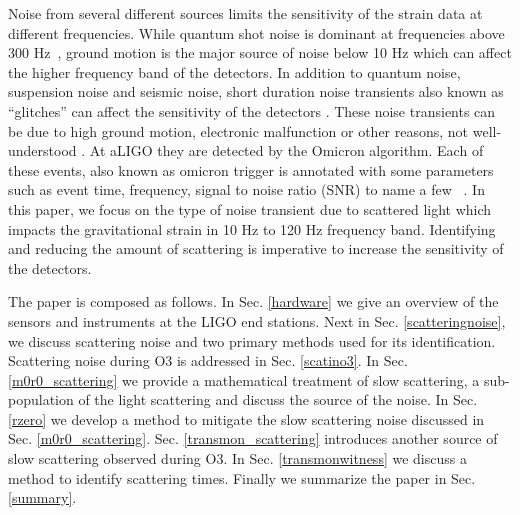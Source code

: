 \documentclass[12pt]{iopart}
\begin{document}
Noise from several different sources limits the sensitivity of the strain data at different frequencies. 
While quantum shot noise is dominant at frequencies above 300 Hz~\cite{tjthesis}, ground motion is the major source of noise below 10 Hz which can affect the higher frequency band of the detectors. In addition to quantum noise, suspension noise and seismic noise, short duration noise transients also known as ``glitches'' can affect the sensitivity of the detectors \cite{transientpaper}. These noise transients can be due to high ground motion, electronic malfunction or other reasons, not well-understood \cite{Nuttall_2018,noisepaper,Cabero_2019}. At aLIGO they are detected by the Omicron algorithm. Each of these events, also known as omicron trigger is annotated with some parameters such as event time, frequency, signal to noise ratio (SNR) to name a few ~\cite{omicron_florent,jess_thesis}. In this paper, we focus on the type of noise transient due to scattered light which impacts the gravitational strain in 10 Hz to 120 Hz frequency band. Identifying and reducing the amount of scattering is imperative to increase the sensitivity of the detectors. 
 
The paper is composed as follows. In Sec. \ref{hardware} we give an overview of the sensors and instruments at the LIGO end stations. Next in Sec. \ref{scatteringnoise}, we discuss scattering noise and two primary methods used for its identification. Scattering noise during O3 is addressed in Sec. \ref{scatino3}. In Sec. \ref{m0r0_scattering} we provide a mathematical treatment of slow scattering, a sub-population of the light scattering and discuss the source of the noise. In Sec. \ref{rzero} we develop a method to mitigate the slow scattering noise discussed in Sec. \ref{m0r0_scattering}. Sec. \ref{transmon_scattering} introduces another source of slow scattering observed during O3. In Sec. \ref{transmonwitness} we discuss a method to identify scattering times. Finally we summarize the paper in Sec. \ref{summary}. 
\end{document}
